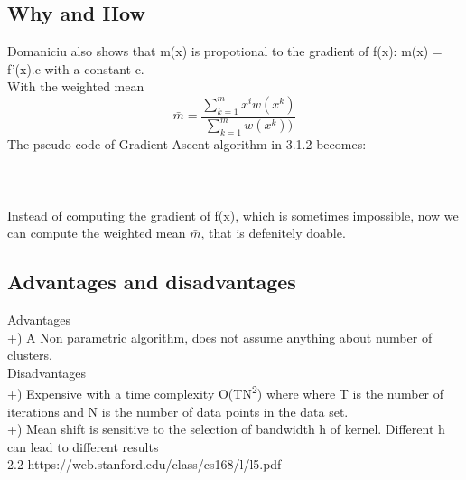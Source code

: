 \subsection{Why and How}
Domaniciu also shows that m(x) is propotional to the gradient of f(x): m(x) = f'(x).c with a constant c.\\ With the weighted mean \[\bar{m} = \frac{\sum_{k=1}^{m}x^i{w(x^k) }}{\sum_{k=1}^{m}{w(x^k) }) }\]The pseudo code of Gradient Ascent algorithm in 3.1.2 becomes:\\\\
\\\\Instead of computing the gradient of f(x), which is sometimes impossible, now we can compute the weighted mean $\bar{m}$, that is defenitely doable. 

\subsection{Advantages and disadvantages}
Advantages\\
+) A Non parametric algorithm, does not assume anything about number of clusters.\\
Disadvantages\\
+) Expensive with a time complexity O(TN\textsuperscript{2}) where where T is the number of iterations and N is the number of data points in the data set.\\
+) Mean shift is sensitive to the selection of bandwidth h of kernel. Different h can lead to different results\\
2.2 https://web.stanford.edu/class/cs168/l/l5.pdf